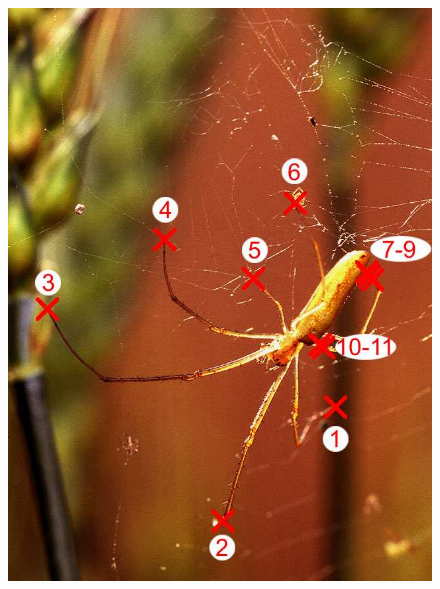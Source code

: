 \begin{figure}
{\includegraphics[scale=0.15]{figures/chapter2/grabcut-connectivity/cp-3.png}
}
\subfloat[]{
}
\end{figure}
